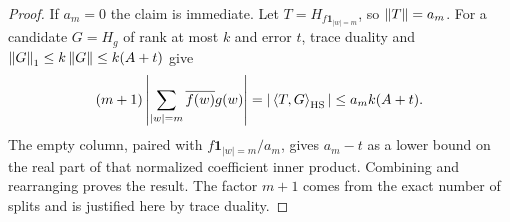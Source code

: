 \begin{proof}
If $a_m=0$ the claim is immediate. Let $T=H_{f\mathbf1_{|w|=m}}$, so $\left\lVert T\right\rVert=a_m$. For a candidate $G=H_g$ of rank at most $k$ and error $t$, trace duality and $\left\lVert G\right\rVert_1\le k\left\lVert G\right\rVert\le k(A+t)$ give
\[
 (m+1)\left|\sum_{|w|=m}\overline{f(w)}g(w)\right|
 =|\left\langle T,G\right\rangle_{\rm HS}|\le a_m k(A+t).
\]
The empty column, paired with $f\mathbf1_{|w|=m}/a_m$, gives $a_m-t$ as a lower bound on the real part of that normalized coefficient inner product. Combining and rearranging proves the result. The factor $m+1$ comes from the exact number of splits and is justified here by trace duality.
\end{proof}

